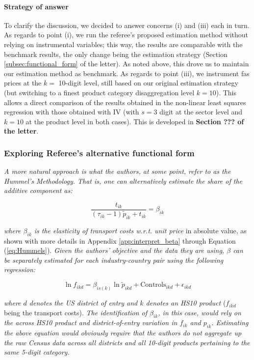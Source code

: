 \documentclass[a4paper,12pt]{article}
\begin{document}
\paragraph{Strategy of answer} To clarify the discussion, we decided to answer concerns (i) and (iii) each in turn. As regards to point (i), we run the referee's proposed estimation method without relying on instrumental variables; this way, the results are comparable with the benchmark results, the only change being the estimation strategy (Section \ref{subsec:functional_form} of the letter). As noted above, this drove us to maintain our estimation method as benchmark. As regards to point (iii), we instrument fas prices at the $k=$ 10-digit level, still based on our original estimation strategy (but switching to a finest product category disaggregation level $k=10$). This allows a direct comparison of the results obtained in the non-linear least squares regression with those obtained with IV (with $s=3$ digit at the sector level and $k=10$ at the product level in both cases). This is developed in \textbf{Section ??? of the letter}.



\subsubsection{Exploring Referee's alternative functional form \label{subsec:functional_form}}


\textit{A more natural approach is what the authors, at some point, refer to as the
Hummel's Methodology. That is, one can alternatively estimate the share of the
additive component as:}

$$\frac{t_{ik}}{ (\tau_{ik}-1)\tilde{p}_{ik} + t_{ik}} = \beta_{ik}$$

\textit{where $\beta_{ik}$ is the elasticity of transport costs w.r.t. unit price} in absolute value, as shown with more details in Appendix \ref{app:interpret_beta} through Equation (\ref{eq:Hummels}). \textit{Given the authors' objective and the data they are using, $\beta$ can be separately estimated
for each industry-country pair using the following regression:}

\begin{equation}
\ln f_{ikd} = \beta_{is(k)}\ln \tilde{p}_{ikd} + \text{Controls}_{ikd} +\epsilon_{ikd} \label{eq:estimation_ref1}
\end{equation}

\textit{where $d$ denotes the US district of entry and $k$ denotes an HS10 product} ($f_{ikd}$ being the transport costs). \textit{The
identification of $\beta_{ik}$, in this case, would rely on the across HS10 product and
district-of-entry variation in $f_{ik}$ and $p_{ik}$. Estimating the above equation would
obviously require that the authors do not aggregate up the raw Census data
across all districts and all 10-digit products pertaining to the same 5-digit category.}
\end{document}

